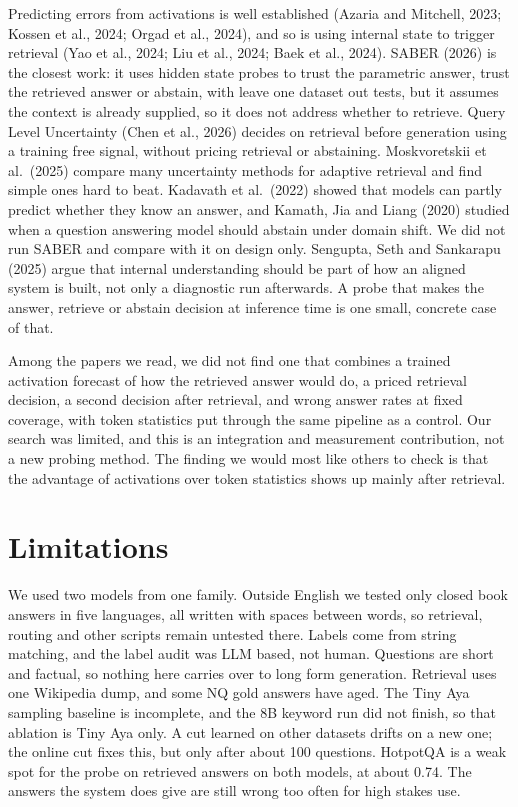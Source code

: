 \documentclass[11pt,a4paper]{article}
\begin{document}
Predicting errors from activations is well established (Azaria and Mitchell, 2023; Kossen et al., 2024; Orgad et al., 2024), and so is using internal state to trigger retrieval (Yao et al., 2024; Liu et al., 2024; Baek et al., 2024). SABER (2026) is the closest work: it uses hidden state probes to trust the parametric answer, trust the retrieved answer or abstain, with leave one dataset out tests, but it assumes the context is already supplied, so it does not address whether to retrieve. Query Level Uncertainty (Chen et al., 2026) decides on retrieval before generation using a training free signal, without pricing retrieval or abstaining. Moskvoretskii et al.\ (2025) compare many uncertainty methods for adaptive retrieval and find simple ones hard to beat. Kadavath et al.\ (2022) showed that models can partly predict whether they know an answer, and Kamath, Jia and Liang (2020) studied when a question answering model should abstain under domain shift. We did not run SABER and compare with it on design only. Sengupta, Seth and Sankarapu (2025) argue that internal understanding should be part of how an aligned system is built, not only a diagnostic run afterwards. A probe that makes the answer, retrieve or abstain decision at inference time is one small, concrete case of that.

Among the papers we read, we did not find one that combines a trained activation forecast of how the retrieved answer would do, a priced retrieval decision, a second decision after retrieval, and wrong answer rates at fixed coverage, with token statistics put through the same pipeline as a control. Our search was limited, and this is an integration and measurement contribution, not a new probing method. The finding we would most like others to check is that the advantage of activations over token statistics shows up mainly after retrieval.

\section{Limitations}

We used two models from one family. Outside English we tested only closed book answers in five languages, all written with spaces between words, so retrieval, routing and other scripts remain untested there. Labels come from string matching, and the label audit was LLM based, not human. Questions are short and factual, so nothing here carries over to long form generation. Retrieval uses one Wikipedia dump, and some NQ gold answers have aged. The Tiny Aya sampling baseline is incomplete, and the 8B keyword run did not finish, so that ablation is Tiny Aya only. A cut learned on other datasets drifts on a new one; the online cut fixes this, but only after about 100 questions. HotpotQA is a weak spot for the probe on retrieved answers on both models, at about 0.74. The answers the system does give are still wrong too often for high stakes use.
\end{document}
